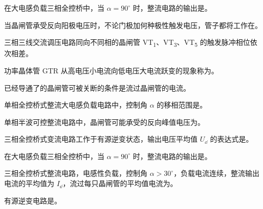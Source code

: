 \documentclass[电力电子]{subfiles}
\begin{document}
\begin{ti}
	在大电感负载三相全控桥中，当 $\alpha = 90^\circ$ 时，整流电路的输出是。
\end{ti}

\begin{ti}
	当晶闸管承受反向阳极电压时，不论门极加何种极性触发电压，管子都将工作在。
\end{ti}

\begin{ti}
	三相三线交流调压电路同向不同相的晶闸管 VT\textsubscript{1}、VT\textsubscript{3}、VT\textsubscript{5} 的触发脉冲相位依次相差。
\end{ti}

\begin{ti}
	功率晶体管 GTR 从高电压小电流向低电压大电流跃变的现象称为。
\end{ti}

\begin{ti}
	已经导通了的晶闸管可被关断的条件是流过晶闸管的电流。
\end{ti}

\begin{ti}
	单相全控桥式整流大电感负载电路中，控制角 $\alpha$ 的移相范围是。
\end{ti}

\begin{ti}
	单相半波可控整流电路中，晶闸管可能承受的反向峰值电压为。
\end{ti}

\begin{ti}
	三相全控桥式变流电路工作于有源逆变状态，输出电压平均值 $U_{\dd}$ 的表达式是。
\end{ti}

\begin{ti}
	在大电感负载三相全控桥中，当 $\alpha = 90^\circ$ 时，整流电路的输出是。
\end{ti}

\begin{ti}
	三相全控桥式整流电路，电感性负载，控制角 $\alpha > 30^\circ$，负载电流连续，整流输出电流的平均值为 $I_{\dd}$，流过每只晶闸管的平均值电流为。
\end{ti}

\begin{ti}
	有源逆变电路是。
\end{ti}
\end{document}
